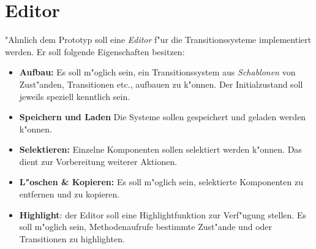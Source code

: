 \section{Editor}
\label{sec:editor}

"Ahnlich dem Prototyp soll eine \emph{Editor} f"ur die Transitionssysteme
implementiert werden. Er soll folgende Eigenschaften besitzen:

\begin{itemize}
\item\textbf{Aufbau:} Es soll m"oglich sein, ein Transitionssystem aus
  \emph{Schablonen} von Zust"anden, Transitionen etc., aufbauen zu k"onnen.
  Der Initialzustand soll jeweils speziell kenntlich sein.
\item \textbf{Speichern und Laden}
  Die Systeme sollen gespeichert und geladen werden k"onnen.
\item \textbf{Selektieren:} Einzelne Komponenten sollen selektiert werden
  k"onnen. Das dient zur Vorbereitung weiterer Aktionen.
\item \textbf{L"oschen \& Kopieren:} Es soll m"oglich sein, selektierte
  Komponenten zu entfernen und zu kopieren.
\item \textbf{Highlight}: der Editor soll eine Highlightfunktion zur
  Verf"ugung stellen.  Es soll m"oglich sein, Methodenaufrufe bestimmte
  Zust"ande und oder Transitionen zu highlighten.
\end{itemize}




